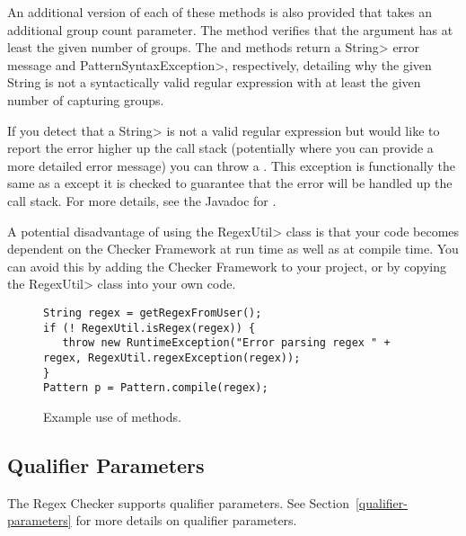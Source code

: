 An additional version of each of these methods is also provided that takes
an additional group count parameter. The
 method
verifies that the argument has at least the given number of groups. The
 and
methods return a \<String> error message and \<Pattern\-Syntax\-Exception>,
respectively, detailing why the given String is not a syntactically valid
regular expression with at least the given number of capturing groups.

\begin{sloppypar}
If you detect that a \<String> is not a valid regular expression but would like
to report the error higher up the call stack (potentially where you can
provide a more detailed error message) you can throw a
. This exception is
functionally the same as a
except it is checked to guarantee that the error will be handled up the
call stack.  For more details, see the Javadoc for
.
\end{sloppypar}

A potential disadvantage of using the \<RegexUtil> class is that your code becomes
dependent on the Checker Framework at run time as well as at compile time.
You can avoid this by adding the Checker Framework to your project, or by
copying the \<RegexUtil> class into
your own code.

\begin{figure}
\begin{smaller}
\begin{Verbatim}
String regex = getRegexFromUser();
if (! RegexUtil.isRegex(regex)) {
   throw new RuntimeException("Error parsing regex " + regex, RegexUtil.regexException(regex));
}
Pattern p = Pattern.compile(regex);
\end{Verbatim}
\end{smaller}
\caption{Example use of  methods.}
\label{fig-regex-util-example}
\end{figure}

\subsection{Qualifier Parameters\label{regex-qual-params}}
The Regex Checker supports qualifier parameters.
See Section~\ref{qualifier-parameters} for more details on qualifier parameters.

